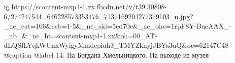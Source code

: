  
 
 
 
 

\ifcmt
  ig https://scontent-mxp1-1.xx.fbcdn.net/v/t39.30808-6/274247544_646228573353476_7137169204277379103_n.jpg?_nc_cat=106&ccb=1-5&_nc_sid=5cd70e&_nc_ohc=1rpF8Y-BucAAX_-_ub_&_nc_ht=scontent-mxp1-1.xx&oh=00_AT-dLQSfLYqkWUnxWyigyMmdepiuh3_TMYZknyjJBYa3uQ&oe=62147C48
  @caption @label 14: На Богдана Хмельницкого. На выходе из музея
\fi
